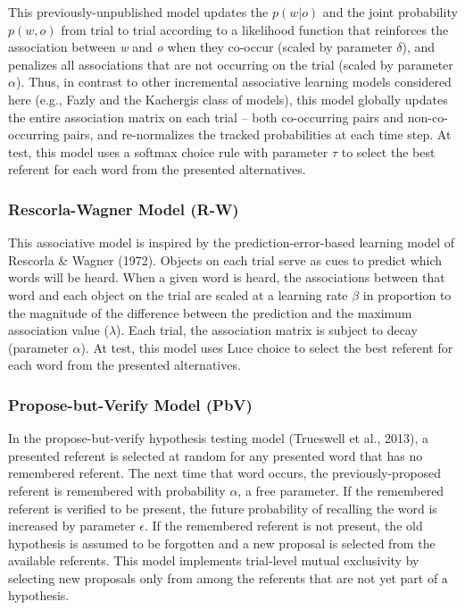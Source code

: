 \documentclass[10pt, letterpaper]{article}
\begin{document}
This previously-unpublished model updates the \(p(w|o)\) and the joint
probability \(p(w,o)\) from trial to trial according to a likelihood
function that reinforces the association between \emph{w} and \emph{o}
when they co-occur (scaled by parameter \(\delta\)), and penalizes all
associations that are not occurring on the trial (scaled by parameter
\(\alpha\)). Thus, in contrast to other incremental associative learning
models considered here (e.g., Fazly and the Kachergis class of models),
this model globally updates the entire association matrix on each trial
-- both co-occurring pairs and non-co-occurring pairs, and re-normalizes
the tracked probabilities at each time step. At test, this model uses a
softmax choice rule with parameter \(\tau\) to select the best referent
for each word from the presented alternatives.

\hypertarget{rescorla-wagner-model-r-w}{%
\subsubsection{Rescorla-Wagner Model
(R-W)}\label{rescorla-wagner-model-r-w}}

This associative model is inspired by the prediction-error-based
learning model of Rescorla \& Wagner (1972). Objects on each trial serve
as cues to predict which words will be heard. When a given word is
heard, the associations between that word and each object on the trial
are scaled at a learning rate \(\beta\) in proportion to the magnitude
of the difference between the prediction and the maximum association
value (\(\lambda\)). Each trial, the association matrix is subject to
decay (parameter \(\alpha\)). At test, this model uses Luce choice to
select the best referent for each word from the presented alternatives.

\hypertarget{propose-but-verify-model-pbv}{%
\subsubsection{Propose-but-Verify Model
(PbV)}\label{propose-but-verify-model-pbv}}

In the propose-but-verify hypothesis testing model (Trueswell et al.,
2013), a presented referent is selected at random for any presented word
that has no remembered referent. The next time that word occurs, the
previously-proposed referent is remembered with probability \(\alpha\),
a free parameter. If the remembered referent is verified to be present,
the future probability of recalling the word is increased by parameter
\(\epsilon\). If the remembered referent is not present, the old
hypothesis is assumed to be forgotten and a new proposal is selected
from the available referents. This model implements trial-level mutual
exclusivity by selecting new proposals only from among the referents
that are not yet part of a hypothesis.
\end{document}
